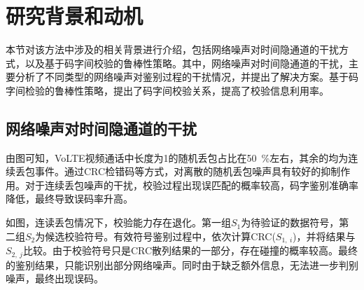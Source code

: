 \section{研究背景和动机}
\label{chap:hash:motivation}

本节对该方法中涉及的相关背景进行介绍，包括网络噪声对时间隐通道的干扰方式，以及基于码字间校验的鲁棒性策略。其中，网络噪声对时间隐通道的干扰，主要分析了不同类型的网络噪声对鉴别过程的干扰情况，并提出了解决方案。基于码字间检验的鲁棒性策略，提出了码字间校验关系，提高了校验信息利用率。

\subsection{网络噪声对时间隐通道的干扰}
\label{chap:hash:motivation:noise}

由图可知，VoLTE视频通话中长度为1的随机丢包占比在{50\ \%}左右，其余的均为连续丢包事件。通过CRC检错码等方式，对离散的随机丢包噪声具有较好的抑制作用。对于连续丢包噪声的干扰，校验过程出现误匹配的概率较高，码字鉴别准确率降低，最终导致误码率升高。


如图，连读丢包情况下，校验能力存在退化。第一组$S_{1}$为待验证的数据符号，第二组$S_{2}$为候选校验符号。有效符号鉴别过程中，依次计算CRC($S_{1,\ i}$)，并将结果与$S_{2,\ j}$比较。由于校验符号只是CRC散列结果的一部分，存在碰撞的概率较高。最终的鉴别结果，只能识别出部分网络噪声。同时由于缺乏额外信息，无法进一步判别噪声，最终出现误码。

